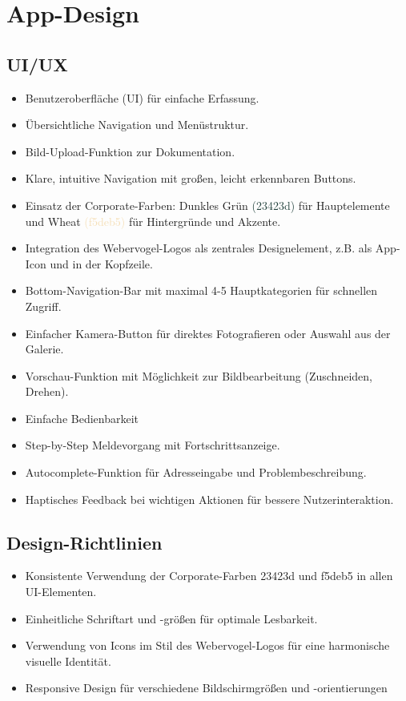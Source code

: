 \section{App-Design}
\subsection{UI/UX}
\begin{itemize}
    \item Benutzeroberfläche (UI) für einfache Erfassung.
    \item Übersichtliche Navigation und Menüstruktur.
    \item Bild-Upload-Funktion zur Dokumentation.
    \item Klare, intuitive Navigation mit großen, leicht erkennbaren Buttons.
    \item Einsatz der Corporate-Farben: Dunkles Grün \textcolor[HTML]{23423d}{(23423d)} für Hauptelemente und Wheat \textcolor[HTML]{f5deb5}{(f5deb5)} für Hintergründe und Akzente.
    \item Integration des Webervogel-Logos als zentrales Designelement, z.B. als App-Icon und in der Kopfzeile.
    \item Bottom-Navigation-Bar mit maximal 4-5 Hauptkategorien für schnellen Zugriff.
    \item Einfacher Kamera-Button für direktes Fotografieren oder Auswahl aus der Galerie.
    \item Vorschau-Funktion mit Möglichkeit zur Bildbearbeitung (Zuschneiden, Drehen).
    \item Einfache Bedienbarkeit
    \item Step-by-Step Meldevorgang mit Fortschrittsanzeige.
    \item Autocomplete-Funktion für Adresseingabe und Problembeschreibung.
    \item Haptisches Feedback bei wichtigen Aktionen für bessere Nutzerinteraktion.
\end{itemize}

\subsection{Design-Richtlinien}

\begin{itemize}
    \item Konsistente Verwendung der Corporate-Farben 23423d und f5deb5 in allen UI-Elementen.
    \item Einheitliche Schriftart und -größen für optimale Lesbarkeit.
    \item Verwendung von Icons im Stil des Webervogel-Logos für eine harmonische visuelle Identität.
    \item Responsive Design für verschiedene Bildschirmgrößen und -orientierungen
\end{itemize}